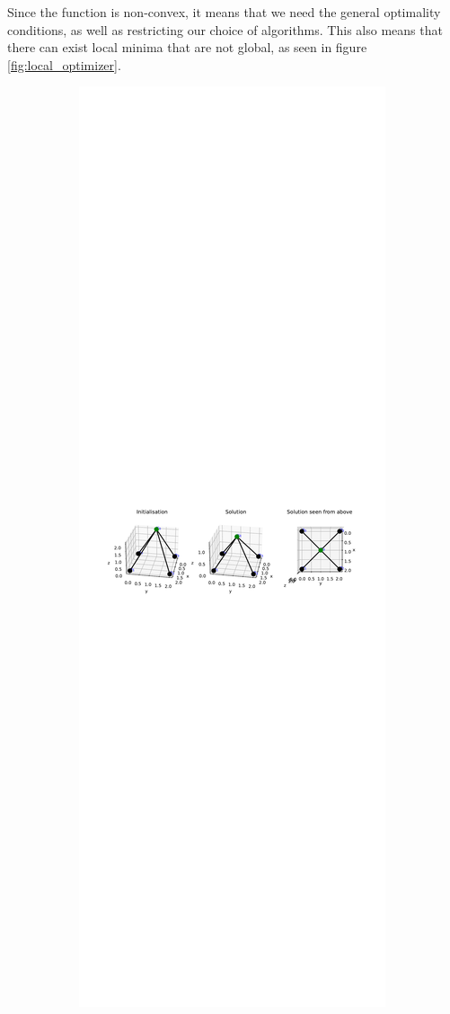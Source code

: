 Since the function is non-convex, it means that we need the general optimality conditions, as well as restricting our choice of algorithms. This also means that there can exist local minima that are not global, as seen in figure \ref{fig:local_optimizer}. 
\begin{figure}
\centering
\begin{subfigure}{.5\textwidth}
  \centering
  \includegraphics[width=\linewidth]{Bilder/localminpos.pdf}

\end{subfigure}
\end{figure}
